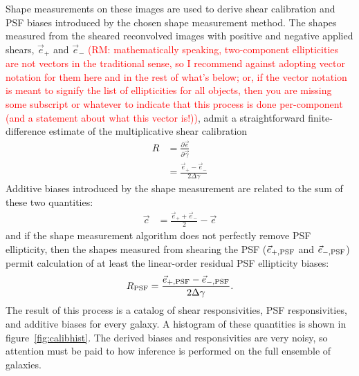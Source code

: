 \documentclass[iop]{emulateapj}
\newcommand\rmcomment[1]{\textcolor{red}{(RM: #1)}}
\begin{document}
Shape measurements on these images are used to derive shear
calibration and PSF biases {introduced by the chosen shape measurement
  method}. The shapes measured from the sheared reconvolved images
with positive and negative applied shears, $\vec{e}_{+}$ and
$\vec{e}_{-}$ \rmcomment{mathematically speaking, two-component
  ellipticities are not vectors in the traditional sense, so I
  recommend against adopting vector notation for them here and in the
  rest of what's below; or, if the vector notation is meant to signify
  the list of ellipticities for all objects, then you are missing some
  subscript or whatever to indicate that this process is done
  per-component (and a statement about what this vector is!)}, admit a
straightforward finite-difference estimate of the multiplicative shear
calibration
\begin{align}
R &= \frac{\partial \vec{e}}{\partial \vec{\gamma}}  \\
 &=\frac{\vec{e}_{+} - \vec{e}_{-}}{2\Delta\gamma}
\end{align}
Additive biases introduced by the shape measurement are related to the
sum of these two quantities:
\begin{align}
\vec{c} &= \frac{\vec{e}_{+} + \vec{e}_{-}}{2} - \vec{e}
\end{align}
and if the shape measurement algorithm does not perfectly remove PSF
ellipticity, then the shapes measured from shearing the PSF
($\vec{e}_{+,\rm PSF}$ and $\vec{e}_{-,\rm PSF}$) permit calculation
of at least the linear-order residual PSF ellipticity biases:
\begin{align}
R_{\rm PSF} = \frac{\vec{e}_{+,\rm PSF} - \vec{e}_{-,\rm PSF}}{2\Delta\gamma}.
\end{align}
The result of this process is a catalog of shear responsivities, PSF
responsivities, and additive biases for every galaxy. A histogram of
these quantities is shown in figure~\ref{fig:calibhist}. The derived
biases and responsivities are very noisy, so attention must be paid to
how inference is performed on the full ensemble of galaxies.
\end{document}
